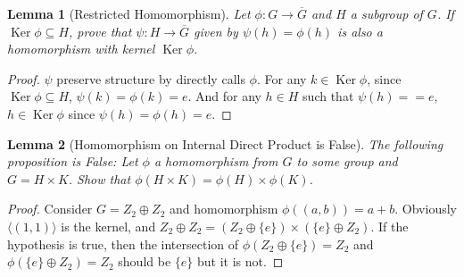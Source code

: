 \documentclass[14pt]{extarticle}
\newtheorem{lemma}{Lemma}[section]
\DeclareMathOperator{\Ker}{Ker}
\newcommand{\1}{\{e\}}
\begin{document}
\begin{lemma}[Restricted Homomorphism]
  Let $\phi : G \rightarrow \overline{G}$ and $H$ a subgroup of $G$.
  If $\Ker \phi \subseteq H$, prove that $\psi : H \rightarrow \overline{G}$
  given by $\psi(h) = \phi(h)$ is also a homomorphism with kernel $\Ker \phi$.
\end{lemma}
\begin{proof}
  $\psi$ preserve structure by directly calls $\phi$.
  For any $k \in \Ker \phi$, since $\Ker \phi \subseteq H$,
  $\psi(k) = \phi(k) = e$.
  And for any $h \in H$ such that $\psi(h) = = e$, $h \in \Ker \phi$
  since $\psi(h) = \phi(h) = e$.
\end{proof}

\begin{lemma}[Homomorphism on Internal Direct Product is False]
  The following proposition is False:
  Let $\phi$ a homomorphism from $G$ to some group and $G = H \times K$.
  Show that $\phi(H \times K) = \phi(H) \times \phi(K)$.
\end{lemma}
\begin{proof}
  Consider $G = Z_2 \oplus Z_2$ and homomorphism $\phi((a , b)) = a + b$.
  Obviously $\langle (1 , 1) \rangle$ is the kernel, and
  $Z_2 \oplus Z_2 = (Z_2 \oplus \1) \times (\1 \oplus Z_2)$.
  If the hypothesis is true, then 
  the intersection of $\phi(Z_2 \oplus \1) = Z_2$ and $\phi(\1 \oplus Z_2) = Z_2$
  should be $\1$ but it is not.
\end{proof}
\end{document}
